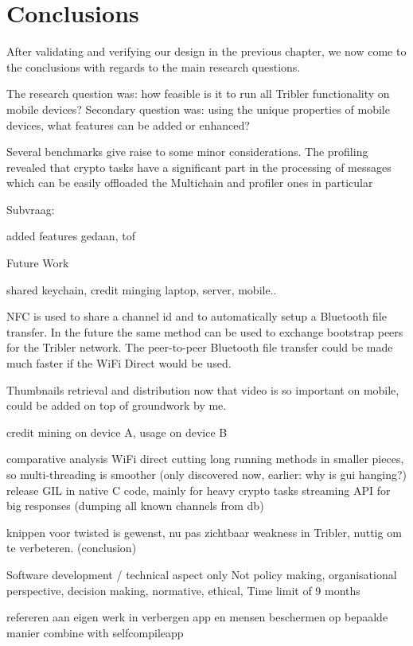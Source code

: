\chapter{Conclusions}
After validating and verifying our design in the previous chapter, we now come to the conclusions with regards to the main research questions.

The research question was: how feasible is it to run all Tribler functionality on mobile devices? %
Secondary question was: using the unique properties of mobile devices, what features can be added or enhanced?

Several benchmarks give raise to some minor considerations.
The profiling revealed that crypto tasks have a significant part in the processing of messages which can be easily offloaded 
the Multichain and profiler ones in particular


Subvraag:

added features gedaan, tof




Future Work

shared keychain, credit minging laptop, server, mobile..


NFC is used to share a channel id and to automatically setup a Bluetooth file transfer.
In the future the same method can be used to exchange bootstrap peers for the Tribler network.
The peer-to-peer Bluetooth file transfer could be made much faster if the WiFi Direct would be used.


Thumbnails retrieval and distribution now that video is so important on mobile, could be added on top of groundwork by me.


credit mining on device A, usage on device B


comparative analysis
WiFi direct
cutting long running methods in smaller pieces, so multi-threading is smoother (only discovered now, earlier: why is gui hanging?)
release GIL in native C code, mainly for heavy crypto tasks
streaming API for big responses (dumping all known channels from db)

knippen voor twisted is gewenst, nu pas zichtbaar weakness in Tribler, nuttig om te verbeteren. (conclusion)


Software development / technical aspect only
Not policy making, organisational perspective, decision making, normative, ethical,
Time limit of 9 months


refereren aan eigen werk in verbergen app en mensen beschermen op bepaalde manier
combine with selfcompileapp
